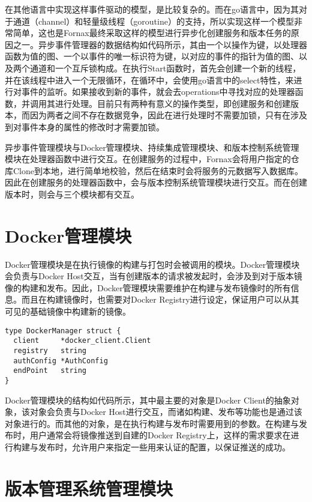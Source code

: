 在其他语言中实现这样事件驱动的模型，是比较复杂的。而在go语言中，因为其对于通道（channel）和轻量级线程（goroutine）的支持，所以实现这样一个模型非常简单，这也是Fornax最终采取这样的模型进行异步化创建服务和版本任务的原因之一。异步事件管理器的数据结构如代码所示，其由一个以操作为键，以处理器函数为值的图、一个以事件的唯一标识符为键，以对应的事件的指针为值的图、以及两个通道和一个互斥锁构成。在执行Start函数时，首先会创建一个新的线程，并在该线程中进入一个无限循环，在循环中，会使用go语言中的select特性，来进行对事件的监听。如果接收到新的事件，就会去operations中寻找对应的处理器函数，并调用其进行处理。目前只有两种有意义的操作类型，即创建服务和创建版本，而因为两者之间不存在数据竞争，因此在进行处理时不需要加锁，只有在涉及到对事件本身的属性的修改时才需要加锁。

异步事件管理模块与Docker管理模块、持续集成管理模块、和版本控制系统管理模块在处理器函数中进行交互。在创建服务的过程中，Fornax会将用户指定的仓库Clone到本地，进行简单地校验，然后在结束时会将服务的元数据写入数据库。因此在创建服务的处理器函数中，会与版本控制系统管理模块进行交互。而在创建版本时，则会与三个模块都有交互。

\section{Docker管理模块}

Docker管理模块是在执行镜像的构建与打包时会被调用的模块。Docker管理模块会负责与Docker Host交互，当有创建版本的请求被发起时，会涉及到对于版本镜像的构建和发布。因此，Docker管理模块需要维护在构建与发布镜像时的所有信息。而且在构建镜像时，也需要对Docker Registry进行设定，保证用户可以从其可见的基础镜像中构建新的镜像。

\begin{lstlisting}[caption={Docker管理模块结构}]
type DockerManager struct {
  client     *docker_client.Client
  registry   string
  authConfig *AuthConfig
  endPoint   string
}
\end{lstlisting}

Docker管理模块的结构如代码所示，其中最主要的对象是Docker Client的抽象对象，该对象会负责与Docker Host进行交互，而诸如构建、发布等功能也是通过该对象进行的。而其他的对象，是在执行构建与发布时需要用到的参数。在构建与发布时，用户通常会将镜像推送到自建的Docker Registry上，这样的需求要求在进行构建与发布时，允许用户来指定一些用来认证的配置，以保证推送的成功。

\section{版本管理系统管理模块}

